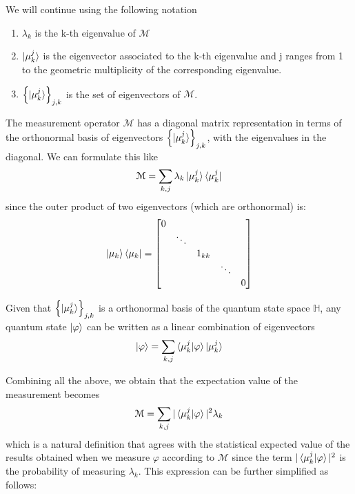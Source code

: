 We will continue using the following notation
\begin{enumerate}
    \item $\lambda_k$ is the k-th eigenvalue of $\mathcal{M}$ 
    \item $\ket{\mu_k^j}$ is the eigenvector associated to the k-th eigenvalue and j ranges from 1 to the geometric multiplicity of the corresponding eigenvalue.
    \item $\left \lbrace \ket{\mu_k^j} \right\rbrace_{j,k}$ is the set of eigenvectors of $\mathcal{M}$. 
\end{enumerate}

The measurement operator $\mathcal{M}$ has a diagonal matrix representation in terms of the orthonormal basis of eigenvectors $\left\lbrace \ket{\mu_k^j} \right\rbrace_{j,k}$, with the eigenvalues in the diagonal.
We can formulate this like
\begin{equation}
    \mathcal{M}=\sum_{k,j} \lambda_k \ket{\mu_k^j} \bra{\mu_k^j}
\end{equation}
since the outer product of two eigenvectors (which are orthonormal) is:
\begin{equation*}
    \ket{\mu_k} \bra{\mu_k} = 
    \begin{bmatrix}
    0 & & & &\\
    & \ddots & & &\\
    &  & 1_{kk} & &\\
    & & & \ddots &\\
    & & & & 0
  \end{bmatrix}
\end{equation*}

Given that $\left \lbrace \ket{\mu_k^j} \right\rbrace_{j,k}$ is a orthonormal basis of the quantum state space $\mathbb{H}$, any quantum state $\ket{\varphi}$ can be written as a linear combination of eigenvectors
\begin{equation}\label{eq:state as linear combination of eigenvectors}
    \ket{\varphi}= \sum_{k,j} \braket{\mu_k^j | \varphi} \ket{\mu_k^j}
\end{equation}

Combining all the above, we obtain that the expectation value of the measurement becomes
\begin{equation}
    \mathcal{M}=\sum_{k,j} |\braket{\mu_k^j|\varphi}|^2 \lambda_k
\end{equation}
which is a natural definition that agrees with the statistical expected value of the results obtained when we measure $\varphi$ according to $\mathcal{M}$ since the term $|\braket{\mu_k^j|\varphi}|^2$ is the probability of measuring $\lambda_k$. This expression can be further simplified as follows:

